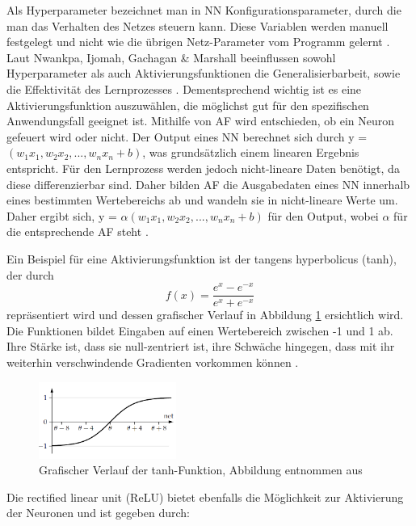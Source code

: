 \documentclass[12pt,a4paper]{article}
\begin{document}
Als Hyperparameter bezeichnet man in NN Konfigurationsparameter, durch die man das Verhalten des Netzes steuern kann. Diese Variablen werden manuell festgelegt und nicht wie die übrigen Netz-Parameter vom Programm gelernt \cite[S. 113]{Goodfellow2015}.
Laut Nwankpa, Ijomah, Gachagan \& Marshall beeinflussen sowohl Hyperparameter als auch Aktivierungsfunktionen die Generalisierbarbeit, sowie die Effektivität des Lernprozesses \cite{Nwankpa2018}. Dementsprechend wichtig ist es eine Aktivierungsfunktion auszuwählen, die möglichst gut für den spezifischen Anwendungsfall geeignet ist. Mithilfe von AF wird entschieden, ob ein Neuron gefeuert wird oder nicht. Der Output eines NN berechnet sich durch y = $(w_{1}x_{1}, w_{2}x_{2}, ..., w_{n}x_{n} + b)$, was grundsätzlich einem linearen Ergebnis entspricht. Für den Lernprozess werden jedoch nicht-lineare Daten benötigt, da diese differenzierbar sind. Daher bilden AF die Ausgabedaten eines NN innerhalb eines bestimmten Wertebereichs ab und wandeln sie in nicht-lineare Werte um. Daher ergibt sich, y = $ \alpha (w_{1}x_{1}, w_{2}x_{2}, ..., w_{n}x_{n} + b)$ für den Output, wobei $\alpha $ für die entsprechende AF steht \cite{Nwankpa2018}.

Ein Beispiel für eine Aktivierungsfunktion ist der tangens hyperbolicus (tanh), der durch 
\begin{equation}
f(x) = \frac{e^x - e^{-x}}{e^x + e^{-x}}
\end{equation}
repräsentiert wird \cite{Nwankpa2018} und dessen grafischer Verlauf in Abbildung \ref{fig:tanh} ersichtlich wird. Die Funktionen bildet Eingaben auf einen Wertebereich zwischen -1 und 1 ab. Ihre Stärke ist, dass sie null-zentriert ist, ihre Schwäche hingegen, dass mit ihr weiterhin verschwindende Gradienten vorkommen können \cite{Nwankpa2018}.

\begin{figure}
\centering
\includegraphics[width=0.4\textwidth]{pics/tanh.png}	
\caption{Grafischer Verlauf der tanh-Funktion, Abbildung entnommen aus \cite[S. 45]{Kruse2015}}
\label{fig:tanh}
\end{figure}

Die rectified linear unit (ReLU) bietet ebenfalls die Möglichkeit zur Aktivierung der Neuronen und ist gegeben durch:
\end{document}
